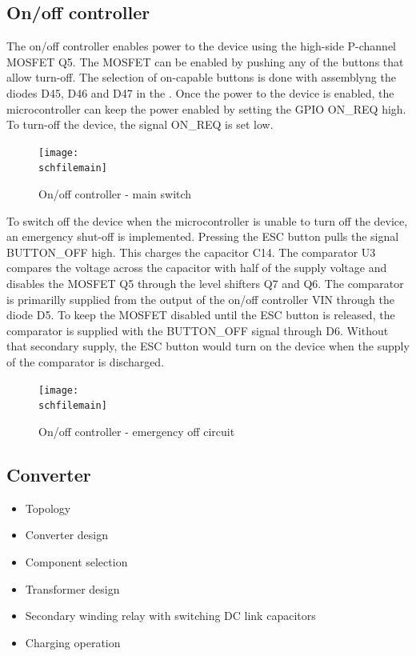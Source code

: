 \FloatBarrier

\subsection{On/off controller}
\label{sec_onoff}
The on/off controller enables power to the device using the high-side P-channel \ac{MOSFET} Q5. The \ac{MOSFET} can be enabled by pushing any of the buttons that allow turn-off. The selection of on-capable buttons is done with assemblyng the diodes D45, D46 and D47 in the . Once the power to the device is enabled, the microcontroller can keep the power enabled by setting the \ac{GPIO} ON\_REQ high. To turn-off the device, the signal ON\_REQ is set low. 

\begin{figure}[h!]
    \centering
    \texttt{[image: \\schfilemain]}
    \caption{On/off controller - main switch}
    \label{fig_onoff_switch}
\end{figure}

To switch off the device when the microcontroller is unable to turn off the device, an emergency shut-off is implemented. Pressing the ESC button pulls the signal BUTTON\_OFF high. This charges the capacitor C14. The comparator U3 compares the voltage across the capacitor with half of the supply voltage and disables the \ac{MOSFET} Q5 through the level shifters Q7 and Q6. The comparator is primarilly supplied from the output of the on/off controller VIN through the diode D5. To keep the \ac{MOSFET} disabled until the ESC button is released, the comparator is supplied with the BUTTON\_OFF signal through D6. Without that secondary supply, the ESC button would turn on the device when the supply of the comparator is discharged. 

\begin{figure}[h!]
    \centering
    \texttt{[image: \\schfilemain]}
    \caption{On/off controller - emergency off circuit}
    \label{fig_onoff_emergency_off}
\end{figure}

\FloatBarrier

\subsection{Converter}
\label{sec_converter}
\begin{itemize}
    \item Topology
    \item Converter design
    \item Component selection
    \item Transformer design
    \item Secondary winding relay with switching DC link capacitors
    \item Charging operation
\end{itemize}

